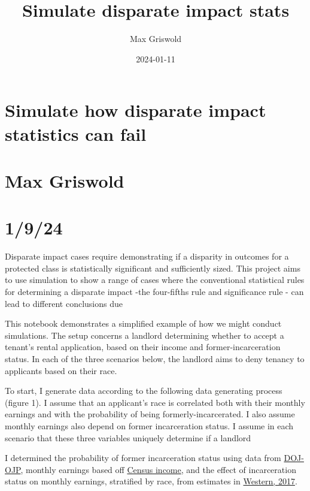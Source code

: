 \documentclass[
]{article}
\title{Simulate disparate impact stats}
\author{Max Griswold}
\date{2024-01-11}
\begin{document}
\maketitle

\hypertarget{simulate-how-disparate-impact-statistics-can-fail}{%
\section{Simulate how disparate impact statistics can
fail}\label{simulate-how-disparate-impact-statistics-can-fail}}

\hypertarget{max-griswold}{%
\section{Max Griswold}\label{max-griswold}}

\hypertarget{section}{%
\section{1/9/24}\label{section}}

Disparate impact cases require demonstrating if a disparity in outcomes
for a protected class is statistically significant and sufficiently
sized. This project aims to use simulation to show a range of cases
where the conventional statistical rules for determining a disparate
impact -the four-fifths rule and significance rule - can lead to
different conclusions due

This notebook demonstrates a simplified example of how we might conduct
simulations. The setup concerns a landlord determining whether to accept
a tenant's rental application, based on their income and
former-incarceration status. In each of the three scenarios below, the
landlord aims to deny tenancy to applicants based on their race.

To start, I generate data according to the following data generating
process (figure 1). I assume that an applicant's race is correlated both
with their monthly earnings and with the probability of being
formerly-incarcerated. I also assume monthly earnings also depend on
former incarceration status. I assume in each scenario that these three
variables uniquely determine if a landlord

I determined the probability of former incarceration status using data
from \href{https://bjs.ojp.gov/content/pub/pdf/Llgsfp.pdf}{DOJ-OJP},
monthly earnings based off
\href{https://www.census.gov/library/publications/2023/demo/p60-279.html}{Census
income}, and the effect of incarceration status on monthly earnings,
stratified by race, from estimates in
\href{https://scholar.harvard.edu/files/brucewestern/files/racial_inequality_in_employment_and_earnings_after_incarceration.pdf}{Western,
2017}.
\end{document}
